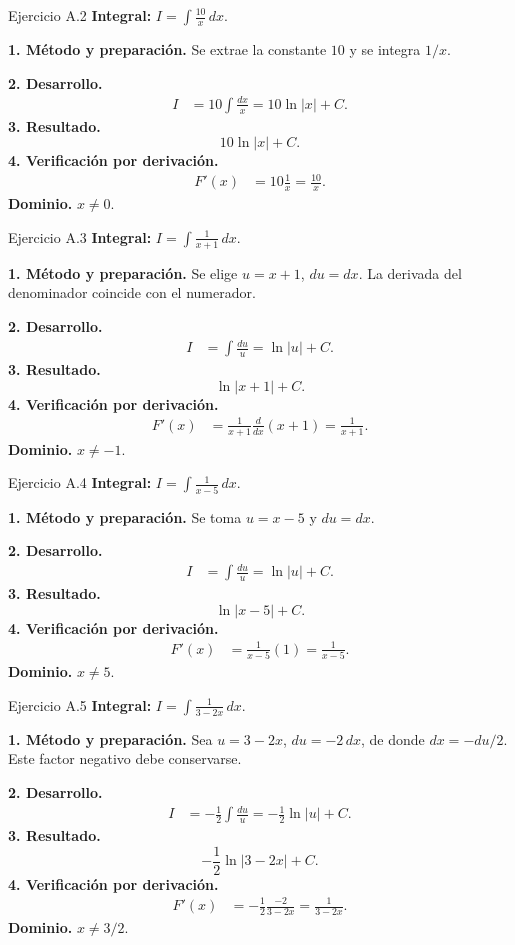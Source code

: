 \begin{examplebox}{Ejercicio A.2}
\textbf{Integral:} $\displaystyle I=\int \frac{10}x\,dx$.

\textbf{1. Método y preparación.} Se extrae la constante $10$ y se integra $1/x$.

\textbf{2. Desarrollo.}
\begin{align*}
I&=10\int\frac{dx}{x}=10\ln|x|+C.
\end{align*}
\textbf{3. Resultado.}
\[
10\ln|x|+C.
\]
\textbf{4. Verificación por derivación.}
\begin{align*}
F'(x)&=10\frac1x=\frac{10}x.
\end{align*}
\textbf{Dominio.} $x\ne0$.
\end{examplebox}

\begin{examplebox}{Ejercicio A.3}
\textbf{Integral:} $\displaystyle I=\int \frac1{x+1}\,dx$.

\textbf{1. Método y preparación.} Se elige $u=x+1$, $du=dx$. La derivada del denominador coincide con el numerador.

\textbf{2. Desarrollo.}
\begin{align*}
I&=\int\frac{du}{u}=\ln|u|+C.
\end{align*}
\textbf{3. Resultado.}
\[
\ln|x+1|+C.
\]
\textbf{4. Verificación por derivación.}
\begin{align*}
F'(x)&=\frac1{x+1}\frac{d}{dx}(x+1)=\frac1{x+1}.
\end{align*}
\textbf{Dominio.} $x\ne-1$.
\end{examplebox}

\begin{examplebox}{Ejercicio A.4}
\textbf{Integral:} $\displaystyle I=\int \frac1{x-5}\,dx$.

\textbf{1. Método y preparación.} Se toma $u=x-5$ y $du=dx$.

\textbf{2. Desarrollo.}
\begin{align*}
I&=\int\frac{du}{u}=\ln|u|+C.
\end{align*}
\textbf{3. Resultado.}
\[
\ln|x-5|+C.
\]
\textbf{4. Verificación por derivación.}
\begin{align*}
F'(x)&=\frac1{x-5}(1)=\frac1{x-5}.
\end{align*}
\textbf{Dominio.} $x\ne5$.
\end{examplebox}

\begin{examplebox}{Ejercicio A.5}
\textbf{Integral:} $\displaystyle I=\int \frac1{3-2x}\,dx$.

\textbf{1. Método y preparación.} Sea $u=3-2x$, $du=-2\,dx$, de donde $dx=-du/2$. Este factor negativo debe conservarse.

\textbf{2. Desarrollo.}
\begin{align*}
I&=-\frac12\int\frac{du}{u}=-\frac12\ln|u|+C.
\end{align*}
\textbf{3. Resultado.}
\[
-\frac12\ln|3-2x|+C.
\]
\textbf{4. Verificación por derivación.}
\begin{align*}
F'(x)&=-\frac12\frac{-2}{3-2x}=\frac1{3-2x}.
\end{align*}
\textbf{Dominio.} $x\ne3/2$.
\end{examplebox}

